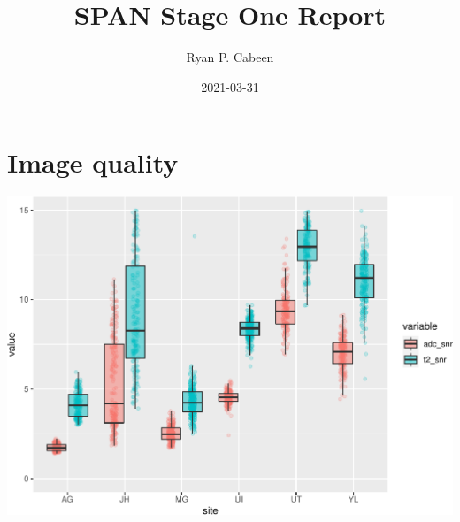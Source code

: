 \documentclass[
]{article}
\title{SPAN Stage One Report}
\author{Ryan P. Cabeen}
\date{2021-03-31}
\begin{document}
\maketitle

\newpage

\hypertarget{image-quality}{%
\section{Image quality}\label{image-quality}}

\begin{center}\includegraphics{paper_files/figure-latex/plot_snr-1} \end{center}
\end{document}
